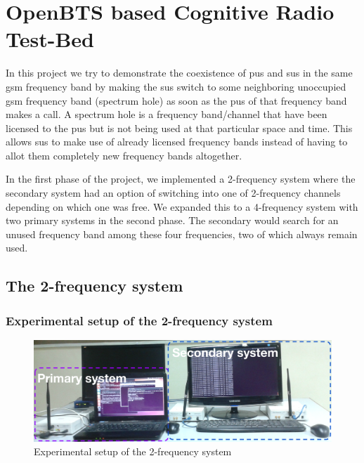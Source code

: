 \chapter{OpenBTS based Cognitive Radio Test-Bed}

In this project we try to demonstrate the coexistence of \glspl{pu} and \glspl{su}
in the same \gls{gsm} frequency band by making the \glspl{su} switch to 
some neighboring unoccupied \gls{gsm} frequency band (spectrum hole) as soon as the 
\glspl{pu} of that frequency band makes a call. A spectrum hole is a 
frequency band/channel that have been licensed to the \glspl{pu} but is not 
being used at that particular space and time. This allows \glspl{su} to 
make use of already licensed frequency bands instead of having to allot them 
completely new frequency bands altogether.

In the first phase of the project, we implemented a 2-frequency system where
the secondary system had an option of switching into one of 2-frequency 
channels depending on which one was free. We expanded this to a 4-frequency
system with two primary systems in the second phase. The secondary would 
search for an unused frequency band among these four frequencies, two of which
always remain used.

\section{The 2-frequency system}
\subsection{Experimental setup of the 2-frequency system}

\begin{figure}
\centering
\includegraphics[width=1\textwidth]{../images/freq2}
\caption[Experimental setup, 2-frequency system]{Experimental setup of the 
2-frequency system}
\label{freq2}
\end{figure}




